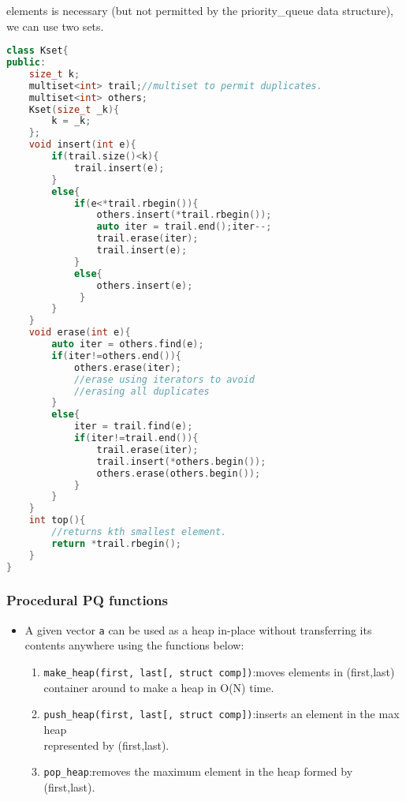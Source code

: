 \documentclass{article}
\begin{document}
elements is necessary (but not permitted by the
priority\_queue data structure), we can use two sets.
\begin{lstlisting}[caption=Kth smallest Element,language=C++]
class Kset{
public:
    size_t k;
    multiset<int> trail;//multiset to permit duplicates.
    multiset<int> others;
    Kset(size_t _k){
        k = _k;
    };
    void insert(int e){
        if(trail.size()<k){
            trail.insert(e);
        }
        else{
            if(e<*trail.rbegin()){
                others.insert(*trail.rbegin());
                auto iter = trail.end();iter--;
                trail.erase(iter);
                trail.insert(e);
            }
            else{
                others.insert(e);
             }
        }
    }
    void erase(int e){
        auto iter = others.find(e);
        if(iter!=others.end()){
            others.erase(iter);
            //erase using iterators to avoid
            //erasing all duplicates
        }
        else{
            iter = trail.find(e);
            if(iter!=trail.end()){
                trail.erase(iter);
                trail.insert(*others.begin());
                others.erase(others.begin());
            }
        }
    }
    int top(){
        //returns kth smallest element.
        return *trail.rbegin();
    }
}
\end{lstlisting}
\subsubsection{Procedural PQ functions}
\begin{itemize}
\item A given vector \texttt{a} can be used as a heap in-place without transferring its contents anywhere using the functions below:
\begin{enumerate}
\item \texttt{make\_heap(first, last[, struct comp])}:moves elements in (first,last) container around to make a heap in O(N) time.
\item \texttt{push\_heap(first, last[, struct comp])}:inserts an element in the max heap \\represented by (first,last).
\item \texttt{pop\_heap}:removes the maximum element in the heap formed by (first,last).
\end{enumerate}
\end{itemize}
\end{document}
